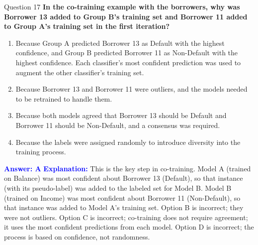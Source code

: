 \documentclass[8pt]{beamer}  %
\begin{document}
	\begin{frame}{Question 17}
		\textbf{In the co-training example with the borrowers, why was Borrower 13 added to Group B's training set and Borrower 11 added to Group A's training set in the first iteration?}
		\begin{enumerate}
			\item Because Group A predicted Borrower 13 as Default with the highest confidence, and Group B predicted Borrower 11 as Non-Default with the highest confidence. Each classifier's most confident prediction was used to augment the other classifier's training set.
			\item Because Borrower 13 and Borrower 11 were outliers, and the models needed to be retrained to handle them.
			\item Because both models agreed that Borrower 13 should be Default and Borrower 11 should be Non-Default, and a consensus was required.
			\item Because the labels were assigned randomly to introduce diversity into the training process.
		\end{enumerate}
		\vspace{0.2cm}
		\textcolor{blue}{\textbf{Answer: A}}
		\vspace{0.2cm}
		\textcolor{blue}{\textbf{Explanation:}} This is the key step in co-training. Model A (trained on Balance) was most confident about Borrower 13 (Default), so that instance (with its pseudo-label) was added to the labeled set for Model B. Model B (trained on Income) was most confident about Borrower 11 (Non-Default), so that instance was added to Model A's training set. Option B is incorrect; they were not outliers. Option C is incorrect; co-training does not require agreement; it uses the most confident predictions from each model. Option D is incorrect; the process is based on confidence, not randomness.
	\end{frame}
	
\end{document}
